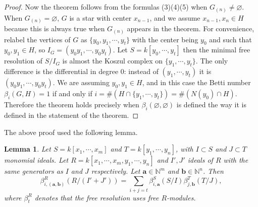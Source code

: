\documentclass[dvipsnames,10pt]{article}
\newtheorem{lemma}[theorem]{Lemma}
\begin{document}
\begin{proof}
    Now the theorem follows from the formulas (3)(4)(5) when $G_{(n)}\neq \varnothing$. When $G_{(n)}= \varnothing$, $G$ is a star with center $x_{n-1}$, and we assume $x_{n-1},x_n\in H$ because this is always true when $G_{(n)}$ appears in the theorem. For convenience, relabel the vertices of $G$ as $\{y_0,y_1,\cdots,y_t\}$ with the center being $y_0$ and such that $y_0,y_1\in H$, so $I_G=(y_0y_1,\cdots,y_0y_t)$. Let $S=k[y_0,\cdots,y_t]$ then the minimal free resolution of $S/I_G$ is almost the Koszul complex on $\{y_1,\cdots,y_t\}$. The only difference is the differential in degree $0$: instead of $(y_1,\cdots,y_t)$ it is $(y_0y_1,\cdots,y_0y_t)$. We are assuming $y_0,y_1\in H$, and in this case the Betti number $\beta_i(G,H)=1$ if and only if $i=\#(H\cap \{y_1,\cdots,y_t\})=\#(N(y_0)\cap H)$. Therefore the theorem holds precisely when $\beta_i(\varnothing,\varnothing)$ is defined the way it is defined in the statement of the theorem.
\end{proof}

The above proof used the following lemma.

\begin{lemma}
    Let $S=k[x_1,\cdots,x_m]$ and $T=k[y_1,\cdots,y_n]$, with $I\subset S$ and $J\subset T$ monomial ideals. Let $R=k[x_1,\cdots,x_m,y_1,\cdots,y_n]$ and $I',J'$ ideals of $R$ with the same generators as $I$ and $J$ respectively. Let $\mathbf{a}\in\mathbb{N}^m$ and $\mathbf{b}\in\mathbb{N}^n$. Then
    \begin{equation*}
        \beta_{i,(\mathbf{a},\mathbf{b})}^R(R/(I'+J')) = \sum_{i+j=t}\beta_{i,\mathbf{a}}^S(S/I)\beta_{j,\mathbf{b}}^T(T/J),
    \end{equation*}
    where $\beta_t^R$ denotes that the free resolution uses free $R$-modules.
\end{lemma}
\end{document}
